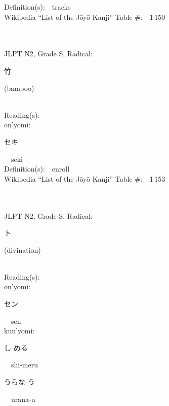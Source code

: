 \begin{multicols}{2}
Definition(s):\ \ tracks \\
Wikipedia ``List of the J\=oy\=o Kanji'' Table \#:\ \ 1\,150 \\
\ \ \\
{\fontsize{34pt}{40pt}  }\ \ \\  %
{JLPT N2, Grade S, Radical:\ \ {\begin{CJK}{UTF8}{min} 竹 \end{CJK}} (bamboo) } \\
Reading(s):\ \ \\
{\hspace*{1em}}on'yomi:\ \ \\
{\hspace*{2em}}{\begin{CJK}{UTF8}{min} セキ \end{CJK}}\ \ seki\ \ \\
Definition(s):\ \ enroll \\
Wikipedia ``List of the J\=oy\=o Kanji'' Table \#:\ \ 1\,153 \\
\ \ \\
{\fontsize{34pt}{40pt}  }\ \ \\  %
{JLPT N2, Grade S, Radical:\ \ {\begin{CJK}{UTF8}{min} 卜 \end{CJK}} (divination) } \\
Reading(s):\ \ \\
{\hspace*{1em}}on'yomi:\ \ \\
{\hspace*{2em}}{\begin{CJK}{UTF8}{min} セン \end{CJK}}\ \ sen\ \ \\
{\hspace*{1em}}kun'yomi:\ \ \\
{\hspace*{2em}}{\begin{CJK}{UTF8}{min} し-める \end{CJK}}\ \ shi-meru\ \ \\
{\hspace*{2em}}{\begin{CJK}{UTF8}{min} うらな-う \end{CJK}}\ \ urana-u\ \ \\

\end{multicols}
